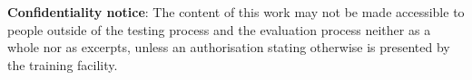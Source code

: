\begin{spacing}{1}
\begin{tabular}{ll}
\end{tabular}


\vspace{1cm}
\end{spacing}

 
\begin{center}
\small
\textbf{Confidentiality notice}:
The content of this work may not be made accessible to people outside of the testing process
and the evaluation process neither as a whole nor as excerpts, unless an authorisation stating
otherwise is presented by the training facility.
\end{center}

